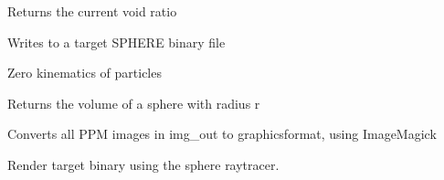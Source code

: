\documentclass[letterpaper,10pt,english]{sphinxmanual}
\begin{document}
\begin{fulllineitems}
\begin{fulllineitems}
\end{fulllineitems}


\begin{fulllineitems}
\label{python_api:sphere.Spherebin.voidRatio}
Returns the current void ratio

\end{fulllineitems}


\begin{fulllineitems}
\label{python_api:sphere.Spherebin.writebin}
Writes to a target SPHERE binary file

\end{fulllineitems}


\begin{fulllineitems}
\label{python_api:sphere.Spherebin.zeroKinematics}
Zero kinematics of particles

\end{fulllineitems}


\end{fulllineitems}


\begin{fulllineitems}
\label{python_api:sphere.V_sphere}
Returns the volume of a sphere with radius r

\end{fulllineitems}


\begin{fulllineitems}
\label{python_api:sphere.convert}
Converts all PPM images in img\_out to graphicsformat, using ImageMagick

\end{fulllineitems}


\begin{fulllineitems}
\label{python_api:sphere.render}
Render target binary using the sphere raytracer.

\end{fulllineitems}
\end{document}
